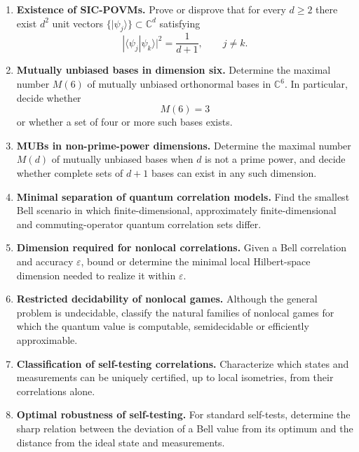 \documentclass{article}
\begin{document}
\begin{enumerate}[label=\textbf{N\arabic*.},leftmargin=*]

\item \precise{} \textbf{Existence of SIC-POVMs.}
Prove or disprove that for every \(d\geq2\) there exist \(d^{2}\) unit
vectors \(\{\lvert\psi_j\rangle\}\subset\mathbb C^d\) satisfying
\[
    |\langle\psi_j|\psi_k\rangle|^2=\frac{1}{d+1},
    \qquad j\neq k .
\]

\item \precise{} \textbf{Mutually unbiased bases in dimension six.}
Determine the maximal number \(M(6)\) of mutually unbiased orthonormal
bases in \(\mathbb C^6\).  In particular, decide whether
\[
    M(6)=3
\]
or whether a set of four or more such bases exists.

\item \precise{} \textbf{MUBs in non-prime-power dimensions.}
Determine the maximal number \(M(d)\) of mutually unbiased bases when
\(d\) is not a prime power, and decide whether complete sets of
\(d+1\) bases can exist in any such dimension.

\item \precise{} \textbf{Minimal separation of quantum correlation models.}
Find the smallest Bell scenario in which finite-dimensional,
approximately finite-dimensional and commuting-operator quantum
correlation sets differ.

\item \precise{} \textbf{Dimension required for nonlocal correlations.}
Given a Bell correlation and accuracy \(\varepsilon\), bound or
determine the minimal local Hilbert-space dimension needed to realize
it within \(\varepsilon\).

\item \precise{} \textbf{Restricted decidability of nonlocal games.}
Although the general problem is undecidable, classify the natural
families of nonlocal games for which the quantum value is computable,
semidecidable or efficiently approximable.

\item \precise{} \textbf{Classification of self-testing correlations.}
Characterize which states and measurements can be uniquely certified,
up to local isometries, from their correlations alone.

\item \precise{} \textbf{Optimal robustness of self-testing.}
For standard self-tests, determine the sharp relation between the
deviation of a Bell value from its optimum and the distance from the
ideal state and measurements.


\end{enumerate}
\end{document}
